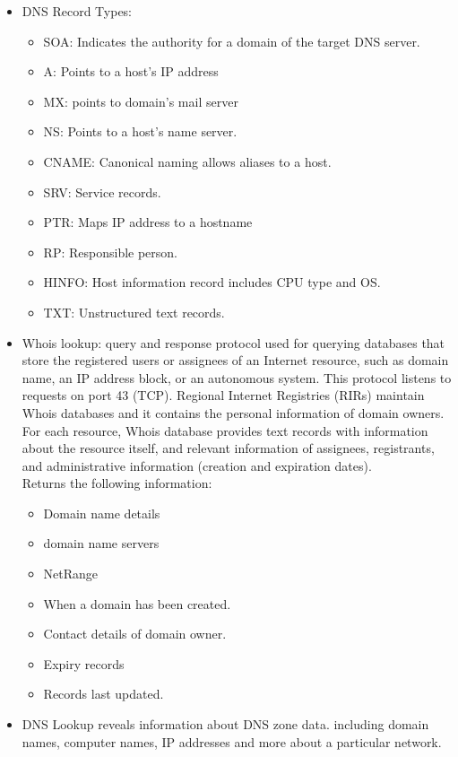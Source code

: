 \begin{itemize}
    \item DNS Record Types:
    \begin{itemize}
        \item SOA: Indicates the authority for a domain of the target DNS server.
        \item A: Points to a host's IP address
        \item MX: points to domain's mail server
        \item NS: Points to a host's name server.
        \item CNAME: Canonical naming allows aliases to a host.
        \item SRV: Service records.
        \item PTR: Maps IP address to a hostname
        \item RP: Responsible person.
        \item HINFO: Host information record includes CPU type and OS.
        \item TXT: Unstructured text records.
    \end{itemize}
    \item Whois lookup: query and response protocol used for querying databases that store the registered users or assignees of an Internet resource, such as domain name, an IP address block, or an autonomous system. This protocol listens to requests on port 43 (TCP). Regional Internet Registries (RIRs) maintain Whois databases and it contains the personal information of domain owners. For each resource, Whois database provides text records with information about the resource itself, and relevant information of assignees, registrants, and administrative information (creation and expiration dates).\\
    Returns the following information:
    \begin{itemize}
        \item Domain name details
        \item domain name servers
        \item NetRange
        \item When a domain has been created.
        \item Contact details of domain owner.
        \item Expiry records
        \item Records last updated.
    \end{itemize}
    \item DNS Lookup reveals information about DNS zone data. including domain names, computer names, IP addresses and more about a particular network.
\end{itemize}
